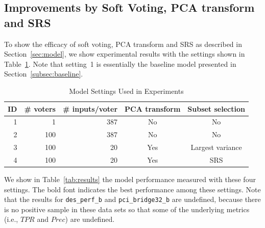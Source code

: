 \documentclass[10pt, final, letter, twocolumns]{IEEEtran}
\begin{document}
\vspace{-1mm}
\subsection{Improvements by Soft Voting, PCA transform and SRS}\vspace{-1mm}
To show the efficacy of soft voting, PCA transform and SRS as described in Section~\ref{sec:model}, we show experimental results with the settings shown in Table~\ref{tab:settings}. Note that setting~1 is essentially the baseline model presented in Section~\ref{subsec:baseline}.

\begin{table}
\scriptsize
\centering
\caption{Model Settings Used in Experiments}\vspace{-3mm}
\label{tab:settings}
\begin{tabular}{rrrcc}
\toprule
ID & \# voters & \# inputs/voter & PCA transform & Subset selection\\
\midrule
1  & 1 & 387 & No & No\\
2 & 100 & 387 & No & No\\
3 & 100 & 20 & Yes & Largest variance\\
4 & 100 & 20 & Yes & SRS\\
\bottomrule
\end{tabular}\vspace{-7mm}
\end{table}

We show in Table~\ref{tab:results} the model performance measured with these four settings. The bold font indicates the best performance among these settings. Note that the results for \texttt{des\_perf\_b} and \texttt{pci\_bridge32\_b} are undefined, because there is no positive sample in these data sets so that some of the underlying metrics (i.e., $TPR$ and $Prec$) are undefined.
\end{document}
